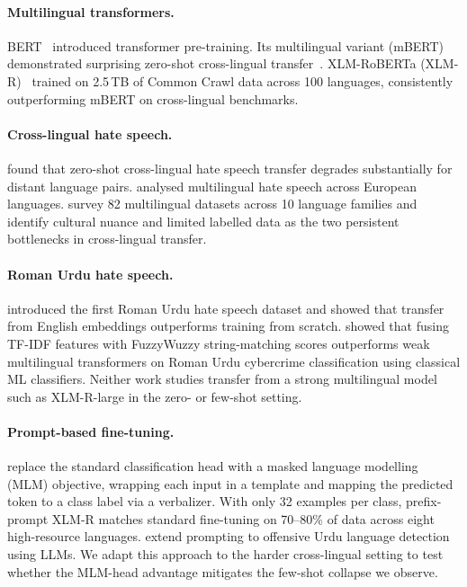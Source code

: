 \documentclass{article}
\begin{document}
\paragraph{Multilingual transformers.}
BERT~\citep{devlin2019bert} introduced transformer pre-training.
Its multilingual variant (mBERT) demonstrated surprising zero-shot cross-lingual
transfer~\citep{pires2019multilingual}.
XLM-RoBERTa (XLM-R)~\citep{conneau2020unsupervised} trained on 2.5\,TB of
Common Crawl data across 100 languages, consistently outperforming mBERT on
cross-lingual benchmarks.

\paragraph{Cross-lingual hate speech.}
\citet{nozza2021exposing} found that zero-shot cross-lingual hate speech transfer
degrades substantially for distant language pairs.
\citet{ousidhoum2019multilingual} analysed multilingual hate speech across European
languages.
\citet{jiang2024crosslingual} survey 82 multilingual datasets across 10 language
families and identify cultural nuance and limited labelled data as the two persistent
bottlenecks in cross-lingual transfer.

\paragraph{Roman Urdu hate speech.}
\citet{rizwan2020hate} introduced the first Roman Urdu hate speech dataset and
showed that transfer from English embeddings outperforms training from scratch.
\citet{ullah2024fuzzy} showed that fusing TF-IDF features with FuzzyWuzzy
string-matching scores outperforms weak multilingual transformers on Roman Urdu
cybercrime classification using classical ML classifiers.
Neither work studies transfer from a strong multilingual model such as XLM-R-large
in the zero- or few-shot setting.

\paragraph{Prompt-based fine-tuning.}
\citet{ullah2025prompt} replace the standard classification head with a masked
language modelling (MLM) objective, wrapping each input in a template and mapping
the predicted token to a class label via a verbalizer.
With only 32 examples per class, prefix-prompt XLM-R matches standard fine-tuning
on 70--80\% of data across eight high-resource languages.
\citet{maab2026prompt} extend prompting to offensive Urdu language detection using
LLMs.
We adapt this approach to the harder cross-lingual setting to test whether the
MLM-head advantage mitigates the few-shot collapse we observe.
\end{document}
